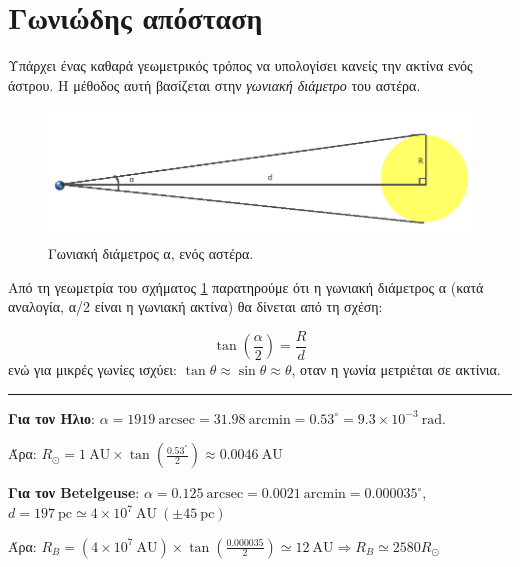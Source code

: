 \section{Γωνιώδης απόσταση}
Υπάρχει ένας καθαρά γεωμετρικός τρόπος να υπολογίσει κανείς την ακτίνα ενός άστρου. Η μέθοδος αυτή βασίζεται στην \textit{γωνιακή διάμετρο} του αστέρα.

\begin{figure}[h]
    \centering
    \includegraphics[scale=0.4]{Figures/angular_diameter.png}
    \caption{Γωνιακή διάμετρος α, ενός αστέρα. }
    \label{fig:angular_diameter}
\end{figure}

Από τη γεωμετρία του σχήματος \ref{fig:angular_diameter} παρατηρούμε ότι η γωνιακή διάμετρος α (κατά αναλογία, α/2 είναι η γωνιακή ακτίνα) θα δίνεται από τη σχέση:

\begin{equation}
    \label{eq:angular_diameter}
    \tan \left( \frac{\alpha}{2} \right) = \frac{R}{d}
\end{equation}
ενώ για μικρές γωνίες ισχύει: $\tan \theta \approx \sin \theta \approx \theta$, οταν η γωνία μετριέται σε ακτίνια.
\\

{\color{red} \hrule}
\textbf{Για τον Ήλιο}: $\alpha = 1919 \ \text{arcsec} = 31.98 \ \text{arcmin} = 0.53^{\circ} = 9.3 \times 10^{-3} \ \text{rad}$.

Άρα: $R_\odot = 1 \ \text{AU} \times \tan \left( \frac{0.53^{\circ}}{2}\right) \approx 0.0046 \ \text{AU}$

\textbf{Για τον Betelgeuse}: $\alpha = 0.125 \ \text{arcsec} = 0.0021 \ \text{arcmin} = 0.000035^{\circ}$, \\ $d=197 \ \text{pc} \simeq 4 \times 10^7 \ \text{AU} \ (\pm 45 \ \text{pc})$

Άρα: $R_B = (4 \times 10^7 \ \text{AU}) \times \tan \left( \frac{0.000035}{2} \right) \simeq 12 \ \text{AU} \Rightarrow R_B \simeq 2580 R_\odot$


